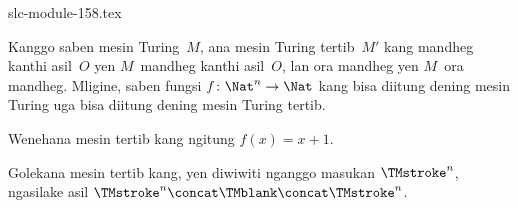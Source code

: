 \begin{filecontents*}[overwrite]{slc-module-158.tex}
\begin{prop} Kanggo saben mesin Turing~$M$,
ana mesin Turing tertib~$M'$ kang mandheg kanthi asil~$O$
yen $M$~mandheg kanthi asil~$O$, lan ora mandheg yen
$M$~ora mandheg. Mligine, saben fungsi $f\colon\Nat^n \to \Nat$
kang bisa diitung dening mesin Turing uga bisa diitung
dening mesin Turing tertib.
\end{prop}

\begin{prob}\label{tur:mac:dis:prob:disc-succ}
Wenehana mesin tertib kang ngitung $f(x) = x+1$.
\end{prob}


\begin{prob}\label{tur:mac:dis:prob:copier}
Golekana mesin tertib kang, yen diwiwiti nganggo masukan $\TMstroke^n$,
ngasilake asil $\TMstroke^n \concat \TMblank \concat \TMstroke^n$.
\end{prob}


\end{filecontents*}

